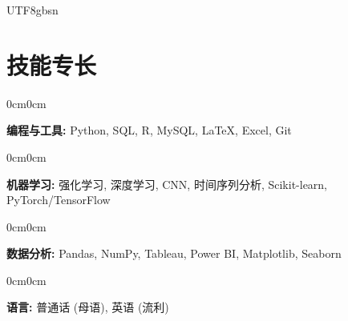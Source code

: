 \documentclass[10pt, letterpaper]{article}
\newenvironment{onecolentry}{
    \begin{adjustwidth}{0cm}{0cm}
}{
    \end{adjustwidth}
}
\begin{document}
\begin{CJK*}{UTF8}{gbsn}
\section{技能专长}

\begin{onecolentry}
\textbf{编程与工具:} Python, SQL, R, MySQL, LaTeX, Excel, Git
\end{onecolentry}

\begin{onecolentry}
\textbf{机器学习:} 强化学习, 深度学习, CNN, 时间序列分析, Scikit-learn, PyTorch/TensorFlow
\end{onecolentry}

\begin{onecolentry}
\textbf{数据分析:} Pandas, NumPy, Tableau, Power BI, Matplotlib, Seaborn
\end{onecolentry}

\begin{onecolentry}
\textbf{语言:} 普通话 (母语), 英语 (流利)
\end{onecolentry}

\end{CJK*}
\end{document}
